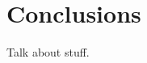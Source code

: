 
\chapter*{Conclusions}
\label{Conclusion} %


\newcommand{\keyword}[1]{\textbf{#1}}
\newcommand{\tabhead}[1]{\textbf{#1}}
\newcommand{\code}[1]{\texttt{#1}}
\newcommand{\file}[1]{\texttt{\bfseries#1}}
\newcommand{\option}[1]{\texttt{\itshape#1}}


Talk about stuff.

